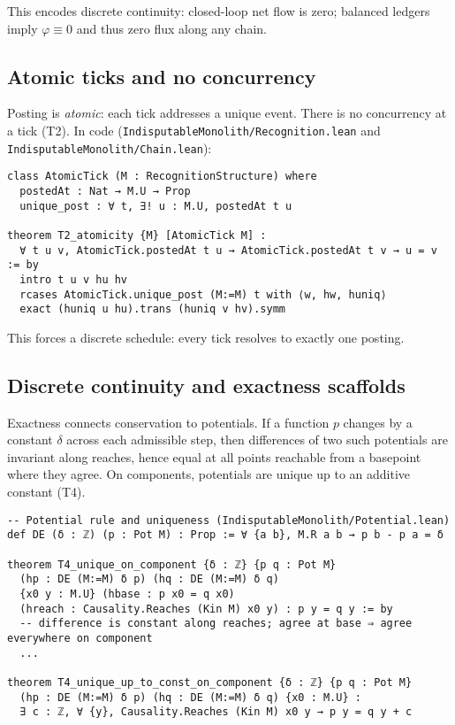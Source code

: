 \documentclass[11pt,a4paper,twoside]{article}
\numberwithin{equation}{section}
\renewcommand{\phi}{\varphi}
\theoremstyle{customthm}
\theoremstyle{customdef}
\theoremstyle{customrem}
\begin{document}
This encodes discrete continuity: closed-loop net flow is zero; balanced ledgers imply $\phi\equiv 0$ and thus zero flux along any chain.

\subsection{Atomic ticks and no concurrency}

Posting is \emph{atomic}: each tick addresses a unique event. There is no concurrency at a tick (T2). In code (\texttt{IndisputableMonolith/Recognition.lean} and \texttt{IndisputableMonolith/Chain.lean}):

\begin{lstlisting}
class AtomicTick (M : RecognitionStructure) where
  postedAt : Nat → M.U → Prop
  unique_post : ∀ t, ∃! u : M.U, postedAt t u

theorem T2_atomicity {M} [AtomicTick M] :
  ∀ t u v, AtomicTick.postedAt t u → AtomicTick.postedAt t v → u = v := by
  intro t u v hu hv
  rcases AtomicTick.unique_post (M:=M) t with ⟨w, hw, huniq⟩
  exact (huniq u hu).trans (huniq v hv).symm
\end{lstlisting}

This forces a discrete schedule: every tick resolves to exactly one posting.

\subsection{Discrete continuity and exactness scaffolds}

Exactness connects conservation to potentials. If a function $p$ changes by a constant $\delta$ across each admissible step, then differences of two such potentials are invariant along reaches, hence equal at all points reachable from a basepoint where they agree. On components, potentials are unique up to an additive constant (T4).

\begin{lstlisting}
-- Potential rule and uniqueness (IndisputableMonolith/Potential.lean)
def DE (δ : ℤ) (p : Pot M) : Prop := ∀ {a b}, M.R a b → p b - p a = δ

theorem T4_unique_on_component {δ : ℤ} {p q : Pot M}
  (hp : DE (M:=M) δ p) (hq : DE (M:=M) δ q)
  {x0 y : M.U} (hbase : p x0 = q x0)
  (hreach : Causality.Reaches (Kin M) x0 y) : p y = q y := by
  -- difference is constant along reaches; agree at base ⇒ agree everywhere on component
  ...

theorem T4_unique_up_to_const_on_component {δ : ℤ} {p q : Pot M}
  (hp : DE (M:=M) δ p) (hq : DE (M:=M) δ q) {x0 : M.U} :
  ∃ c : ℤ, ∀ {y}, Causality.Reaches (Kin M) x0 y → p y = q y + c
\end{lstlisting}
\end{document}
